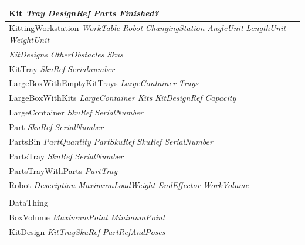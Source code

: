 \documentclass[preprint,12pt]{elsarticle}
\newcommand{\class}[1] {\textsf{#1}}
\begin{document}
\begin{table}[!h!t]
{\begin{tabular}{l}
\hspace{5 mm}\class{Kit} \textit{Tray} \textit{DesignRef} \textit{Parts} \textit{Finished?}
\\\midrule
\hspace{5 mm}\class{KittingWorkstation} \textit{WorkTable} \textit{Robot} \textit{ChangingStation} \textit{AngleUnit} \textit{LengthUnit} \textit{WeightUnit}
\\
\hspace{32 mm} \textit{KitDesigns} \textit{OtherObstacles} \textit{Skus}
\\\midrule
\hspace{5 mm}\class{KitTray} \textit{SkuRef} \textit{Serialnumber}
\\\midrule
\hspace{5 mm}\class{LargeBoxWithEmptyKitTrays} \textit{LargeContainer} \textit{Trays}
\\\midrule
\hspace{5 mm}\class{LargeBoxWithKits} \textit{LargeContainer} \textit{Kits} \textit{KitDesignRef} \textit{Capacity}
\\\midrule
\hspace{5 mm}\class{LargeContainer} \textit{SkuRef} \textit{SerialNumber}
\\\midrule
\hspace{5 mm}\class{Part} \textit{SkuRef} \textit{SerialNumber}
\\\midrule
\hspace{5 mm}\class{PartsBin} \textit{PartQuantity} \textit{PartSkuRef} \textit{SkuRef} \textit{SerialNumber}
\\\midrule
\hspace{5 mm}\class{PartsTray} \textit{SkuRef} \textit{SerialNumber}
\\\midrule
\hspace{5 mm}\class{PartsTrayWithParts} \textit{PartTray}
\\\midrule
\hspace{5 mm}\class{Robot} \textit{Description} \textit{MaximumLoadWeight} \textit{EndEffector} \textit{WorkVolume}
\\\midrule
\hspace{5 mm}
\\\midrule
\class{DataThing}
\\\midrule
\hspace{5 mm}\class{BoxVolume} \textit{MaximumPoint} \textit{MinimumPoint}
\\\midrule
\hspace{5 mm}\class{KitDesign} \textit{KitTraySkuRef} \textit{PartRefAndPoses}

\end{tabular}}
\end{table}
\end{document}

